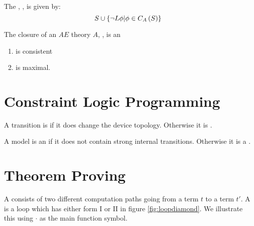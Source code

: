 \begin{defi}
The , , is given by:
\begin{equation}
S\cup\left\{ \neg L\phi|\phi\in C_A\left(S\right)\right\}
\end{equation}
\cite{conf/ijcai/BrewkaK93}
\end{defi}

\begin{defi}
The closure of an $AE$ theory $A$, , is an  \iffTx{}
\begin{enumerate}
 \item {} is consistent
 \item {} is maximal.
\end{enumerate}
\cite{conf/ijcai/BrewkaK93}
\end{defi}

\section{Constraint Logic Programming}

\begin{defi}
A transition is  if it does change the device topology. Otherwise it is .
\cite{conf/ijcai/GrafHPZ89}
\end{defi}

\begin{defi}
A model is an  if it does not contain strong internal transitions. Otherwise it is a .
\cite{conf/ijcai/GrafHPZ89}
\end{defi}

\section{Theorem Proving}

\begin{defi}
A  consists of two different computation paths going from a term $t$ to a term $t'$. A  is a loop which has either form I or II in figure \ref{fig:loopdiamond}. We illustrate this using $\cdot$ as the main function symbol.
\cite{conf/ijcai/Geiser75}
\end{defi}

